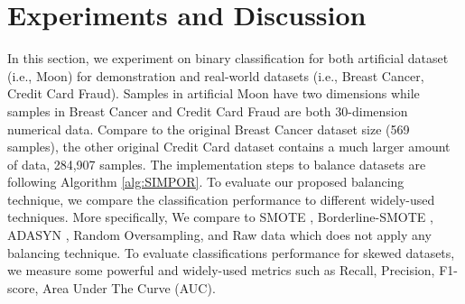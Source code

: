 
\section{Experiments and Discussion}
\label{sec:experiments}
In this section, we experiment on binary classification for both artificial dataset (i.e., Moon) for demonstration and real-world datasets (i.e., Breast Cancer, Credit Card Fraud). Samples in artificial Moon have two dimensions while samples in Breast Cancer and Credit Card Fraud are both 30-dimension numerical data. Compare to the original Breast Cancer dataset size (569 samples), the other original Credit Card dataset contains a much larger amount of data, 284,907 samples. 
The implementation steps to balance datasets are following Algorithm \ref{alg:SIMPOR}. To evaluate our proposed balancing technique, we compare the classification performance to different widely-used techniques. More specifically, We compare \Methodname{} to SMOTE \cite{chawla_smote:_2002}, Borderline-SMOTE \cite{bordersmote},  ADASYN \cite{ADASYN}, Random Oversampling, and Raw data which does not apply any balancing technique. To evaluate classifications performance for skewed datasets, we measure some powerful and widely-used metrics such as Recall, Precision, F1-score, Area Under The Curve (AUC). %


\begin{table}[]
	\centering
	\caption{Classification models' setting for each dataset.}
	\label{tab:model_setting}
	
\end{table}%

